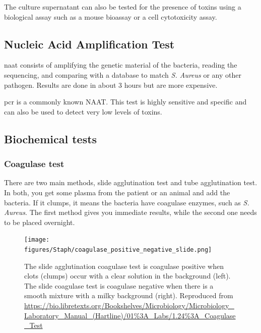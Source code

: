 The culture supernatant can also be tested for the presence of toxins using a biological assay such as a mouse bioassay or a cell cytotoxicity assay.

\subsection{Nucleic Acid Amplification Test}

\gls{naat} consists of amplifying the genetic material of the bacteria, reading the sequencing, and comparing with a database to match \textit{S. Aureus} or any other pathogen. Results are done in about 3 hours but are more expensive.

\gls{pcr} is a commonly known NAAT. This test is highly sensitive and specific and can also be used to detect very low levels of toxins.

\subsection{Biochemical tests}

\subsubsection{Coagulase test}

There are two main methods, slide agglutination test and  tube agglutination test. In both, you get some plasma from the patient or an animal and add the bacteria. If it clumps, it means the bacteria have coagulase enzymes, such as \textit{S. Aureus}. The first method gives you immediate results, while the second one needs to be placed overnight.

    \begin{figure}[h]
        \centering
            \texttt{[image: figures/Staph/coagulase\_positive\_negative\_slide.png]} 
        \caption{The slide agglutination coagulase test is coagulase positive when clots (clumps) occur with a clear solution in the background (left). The slide coagulase test is coagulase negative when there is a smooth mixture with a milky background (right). Reproduced from \url{ https://bio.libretexts.org/Bookshelves/Microbiology/Microbiology\_Laboratory\_Manual\_(Hartline)/01\%3A\_Labs/1.24\%3A\_Coagulase_Test}}
        \label{figure:coagualaseSlide}
    \end{figure}


